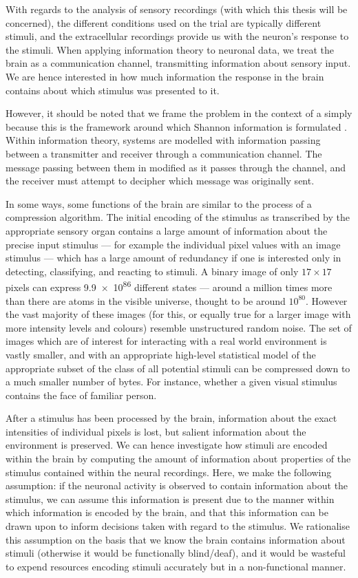 With regards to the analysis of sensory recordings (with which this thesis will be concerned), the different conditions used on the trial are typically different stimuli, and the extracellular recordings provide us with the neuron's response to the stimuli.
When applying information theory to neuronal data, we treat the brain as a communication channel, transmitting information about sensory input.
We are hence interested in how much information the response in the brain contains about which stimulus was presented to it.

However, it should be noted that we frame the problem in the context of a  simply because this is the framework around which Shannon information is formulated \citep{mackay2003information}.
Within information theory, systems are modelled with information passing between a transmitter and receiver through a communication channel.
The message passing between them in modified as it passes through the channel, and the receiver must attempt to decipher which message was originally sent.

In some ways, some functions of the brain are similar to the process of a compression algorithm.
The initial encoding of the stimulus as transcribed by the appropriate sensory organ contains a large amount of information about the precise input stimulus --- for example the individual pixel values with an image stimulus --- which has a large amount of redundancy if one is interested only in detecting, classifying, and reacting to stimuli.
A binary image of only $17 \times 17$ pixels can express \num{9.9e86} different states --- around a million times more than there are atoms in the visible universe, thought to be around $10^{80}$.
However the vast majority of these images (for this, or equally true for a larger image with more intensity levels and colours) resemble unstructured random noise.
The set of images which are of interest for interacting with a real world environment is vastly smaller, and with an appropriate high-level statistical model of the appropriate subset of the class of all potential stimuli can be compressed down to a much smaller number of bytes.
For instance, whether a given visual stimulus contains the face of familiar person.

After a stimulus has been processed by the brain, information about the exact intensities of individual pixels is lost, but salient information about the environment is preserved.
We can hence investigate how stimuli are encoded within the brain by computing the amount of information about properties of the stimulus contained within the neural recordings.
Here, we make the following assumption: if the neuronal activity is observed to contain information about the stimulus, we can assume this information is present due to the manner within which information is encoded by the brain, and that this information can be drawn upon to inform decisions taken with regard to the stimulus.
We rationalise this assumption on the basis that we know the brain contains information about stimuli (otherwise it would be functionally blind/deaf), and it would be wasteful to expend resources encoding stimuli accurately but in a non-functional manner.

